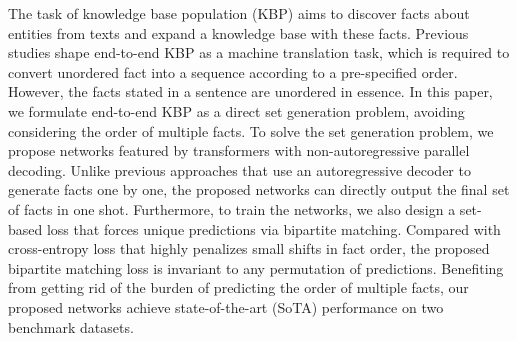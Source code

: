 The task of knowledge base population (KBP) aims to discover facts about entities from texts and expand a knowledge base with these facts. Previous studies shape end-to-end KBP as a machine translation task, which is required to convert unordered fact into a sequence according to a pre-specified order. However, the facts stated in a sentence are unordered in essence. In this paper, we formulate end-to-end KBP as a direct set generation problem, avoiding considering the order of multiple facts. To solve the set generation problem, we propose networks featured by transformers with non-autoregressive parallel decoding. Unlike previous approaches that use an autoregressive decoder to generate facts one by one, the proposed networks can directly output the final set of facts in one shot. Furthermore, to train the networks, we also design a set-based loss that forces unique predictions via bipartite matching. Compared with cross-entropy loss that highly penalizes small shifts in fact order, the proposed bipartite matching loss is invariant to any permutation of predictions. Benefiting from getting rid of the burden of predicting the order of multiple facts, our proposed networks achieve state-of-the-art (SoTA) performance on two benchmark datasets.
